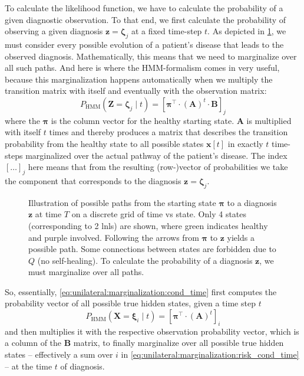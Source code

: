 \documentclass[\relativeRoot/main.tex]{subfiles}
\begin{document}
To calculate the likelihood function, we have to calculate the probability of a given diagnostic observation. To that end, we first calculate the probability of observing a given diagnosis $\mathbf{z} = \boldsymbol{\zeta}_j$ at a fixed time-step $t$. As depicted in \cref{fig:unilateral:hmm_paths}, we must consider every possible evolution of a patient's disease that leads to the observed diagnosis. Mathematically, this means that we need to marginalize over all such paths. And here is where the HMM-formalism comes in very useful, because this marginalization happens automatically when we multiply the transition matrix with itself and eventually with the observation matrix:
%
\begin{equation} \label{eq:unilateral:marginalization:cond_time}
    P_\text{HMM} \left( \mathbf{Z} = \boldsymbol{\zeta}_j \mid t \right) = \left[ \boldsymbol{\pi}^\top \cdot (\mathbf{A})^t \cdot \mathbf{B} \right]_j
\end{equation}
%
where the $\boldsymbol{\pi}$ is the column vector for the healthy starting state. $\mathbf{A}$ is multiplied with itself $t$ times and thereby produces a matrix that describes the transition probability from the healthy state to all possible states $\mathbf{x}[t]$ in exactly $t$ time-steps marginalized over the actual pathway of the patient's disease. The index $[\ldots]_j$ here means that from the resulting (row-)vector of probabilities we take the component that corresponds to the diagnosis $\mathbf{z} = \boldsymbol{\zeta}_j$.

\begin{figure}
    \centering
    \def\svgwidth{0.9\textwidth}
    
    \caption[Schematic illustrating possible evolution paths of the HMM for a simple case]{Illustration of possible paths from the starting state $\boldsymbol{\pi}$ to a diagnosis $\mathbf{z}$ at time $T$ on a discrete grid of time vs state. Only 4 states (corresponding to 2 \glspl{lnl}) are shown, where green indicates healthy and purple involved. Following the arrows from $\boldsymbol{\pi}$ to $\mathbf{z}$ yields a possible path. Some connections between states are forbidden due to $Q$ (no self-healing). To calculate the probability of a diagnosis $\mathbf{z}$, we must marginalize over all paths.}
    \label{fig:unilateral:hmm_paths}
\end{figure}

So, essentially, \cref{eq:unilateral:marginalization:cond_time} first computes the probability vector of all possible true hidden states, given a time step $t$
%
\begin{equation} \label{eq:unilateral:marginalization:risk_cond_time}
    P_\text{HMM} \left( \mathbf{X} = \boldsymbol{\xi}_i \mid t \right) = \left[ \boldsymbol{\pi}^\top \cdot (\mathbf{A})^t \right]_i
\end{equation}
%
and then multiplies it with the respective observation probability vector, which is a column of the $\mathbf{B}$ matrix, to finally marginalize over all possible true hidden states -- effectively a sum over $i$ in \cref{eq:unilateral:marginalization:risk_cond_time} -- at the time $t$ of diagnosis.
\end{document}
